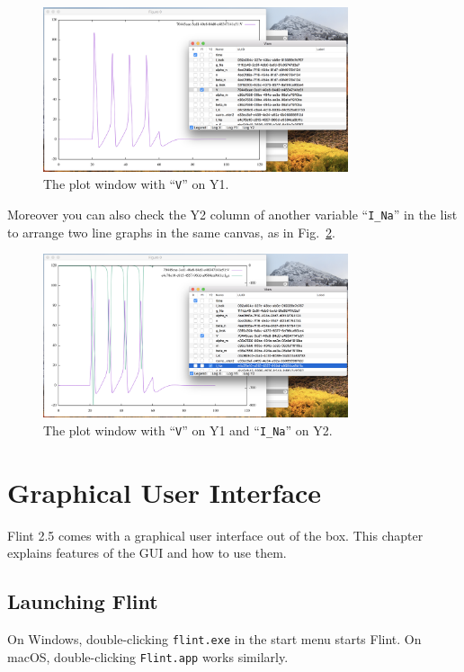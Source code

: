 \documentclass[a4paper,10pt]{report}
\begin{document}
\begin{figure}[htbp]
\centering
\includegraphics[width=0.8\textwidth]{image/hh-plot-v.png}
\caption{\label{fig:org2dcae36}The plot window with ``\texttt{V}'' on Y1.}
\end{figure}

Moreover you can also check the Y2 column of another variable ``\texttt{I\_Na}'' in the
list to arrange two line graphs in the same canvas, as in
Fig.~\ref{fig:org42be786}.

\begin{figure}[htbp]
\centering
\includegraphics[width=0.8\textwidth]{image/hh-plot-v-ina.png}
\caption{\label{fig:org42be786}The plot window with ``\texttt{V}'' on Y1 and ``\texttt{I\_Na}'' on Y2.}
\end{figure}

\chapter{Graphical User Interface}
\label{sec:orgf694739}
Flint 2.5 comes with a graphical user interface out of the box. This chapter
explains features of the GUI and how to use them.

\section{Launching Flint}
\label{sec:org5d23548}
On Windows, double-clicking \texttt{flint.exe} in the start menu starts Flint.
On macOS, double-clicking \texttt{Flint.app} works similarly.
\end{document}
